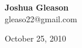 \begin{titlepage}
\begin{center}



  \vspace*{0.2\textheight}

  { \large \bfseries Joshua Gleason}\\
  { \large gleaso22@gmail.com}\\

\vspace*{\fill}
  
\vspace*{\fill}

{\large October 25, 2010}

\end{center}

\end{titlepage}

